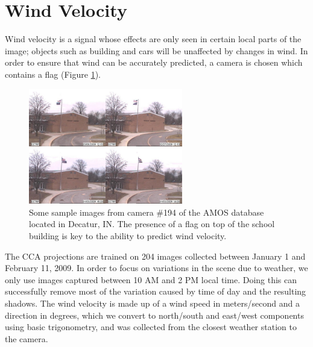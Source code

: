 \section{Wind Velocity}
Wind velocity is a signal whose effects are only seen in certain local parts of the image; objects such as building and cars will be unaffected by changes in wind. In order to ensure that wind can be accurately predicted, a camera is chosen which contains a flag (Figure \ref{fig:windspeedextremes}). 
\begin{figure}
	\centering
		\includegraphics[width=0.60\textwidth]{figures/windspeedextremes.jpg}
	\caption[Some sample images from camera $\#$194 of the AMOS database located in Decatur, IN]{Some sample images from camera $\#$194 of the AMOS database located in Decatur, IN. The presence of a flag on top of the school building is key to the ability to predict wind velocity.}
	\label{fig:windspeedextremes}
\end{figure}

The CCA projections are trained on 204 images collected between January 1 and February 11, 2009. In order to focus on variations in the scene due to weather, we only use images captured between 10 AM and 2 PM local time. Doing this can successfully remove most of the variation caused by time of day and the resulting shadows. The wind velocity is made up of a wind speed in meters/second and a direction in degrees, which we convert to north/south and east/west components using basic trigonometry, and was collected from the closest weather station to the camera. 

